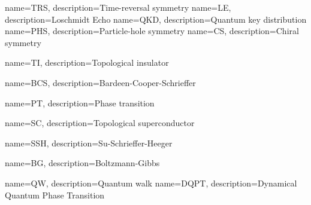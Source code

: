 %
%
%
%
%
%



{
name={TRS},
description={Time-reversal symmetry}
}
{
name={LE},
description={Loschmidt Echo}
}
{
name={QKD},
description={Quantum key distribution}
}
{
name={PHS},
description={Particle-hole symmetry}
}
{
name={CS},
description={Chiral symmetry}
}

{
name={TI},
description={Topological insulator}
}


{
name={BCS},
description={Bardeen-Cooper-Schrieffer}
}

{
name={PT},
description={Phase transition}
}

{
name={SC},
description={Topological superconductor}
}

{
name={SSH},
description={Su-Schrieffer-Heeger}
}

{
name={BG},
description={Boltzmann-Gibbs}
}

{
name={QW},
description={Quantum walk}
}
{
name={DQPT},
description={Dynamical Quantum Phase Transition}
}